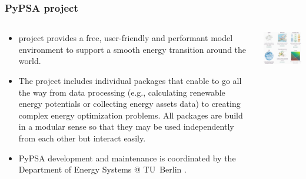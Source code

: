 \begin{frame}
  \frametitle{PyPSA project}

\begin{columns}[T]
\begin{column}{7cm}

{\small
  \begin{itemize}
  \item {} project provides a free, user-friendly and performant model environment to support a smooth energy transition around the world. 
  \item The project includes individual packages that enable to go all the way from data processing (e.g., calculating renewable energy potentials or collecting energy assets data) to creating complex energy optimization problems. All packages are build in a modular sense so that they may be used independently from each other but interact easily.
  \item PyPSA development and maintenance is coordinated by the Department of Energy Systems @ TU~Berlin .  
  \end{itemize}
}
\end{column}
\begin{column}{9cm}

\centering
\includegraphics[width=8.5cm]{images/pypsa-web.png}

\end{column}
\end{columns}

\end{frame}




